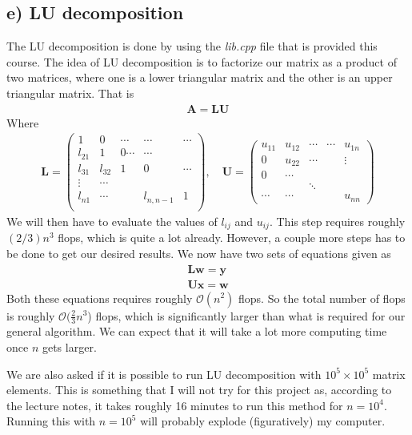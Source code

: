 \documentclass[12pt]{article}
\begin{document}
\subsection*{e) LU decomposition}
The LU decomposition is done by using the \textit{lib.cpp} file that is provided this course. The idea of LU decomposition is to factorize our matrix as a product of two matrices, where one is a lower triangular matrix and the other is an upper triangular matrix. That is
\begin{align}
\mathbf{A} = \mathbf{L}\mathbf{U}
\end{align}
Where
\begin{align*}
\mathbf{L} =
\begin{pmatrix}
1 & 0 & \cdots & \cdots & \cdots \\
l_{21} & 1 & 0 \cdots & \cdots \\
l_{31} & l_{32} & 1 & 0 & \cdots \\
\vdots & \cdots & & & \\
l_{n1} & \cdots & & l_{n,n-1} & 1 \\
\end{pmatrix}, \quad
\mathbf{U} =
\begin{pmatrix}
u_{11} & u_{12} & \cdots & \cdots & u_{1n} \\
0 & u_{22} &\cdots & & \vdots \\
0 & \cdots & & & \\
& & \ddots & & \\
\cdots& \cdots & & & u_{nn}
\end{pmatrix}
\end{align*}
We will then have to evaluate the values of $l_{ij}$ and $u_{ij}$. This step requires roughly $(2/3)n^3$ flops, which is quite a lot already. However, a couple more steps has to be done to get our desired results. We now have two sets of equations given as
\begin{align}
\mathbf{L}\mathbf{w} = \mathbf{y} \\
\mathbf{U}\mathbf{x} = \mathbf{w}
\end{align}
Both these equations requires roughly $\mathcal{O}(n^2)$ flops. So the total number of flops is roughly $\mathcal{O}(\frac{2}{3} n^3$) flops, which is significantly larger than what is required for our general algorithm. We can expect that it will take a lot more computing time once $n$ gets larger.

We are also asked if it is possible to run LU decomposition with $10^5 \times 10^5$ matrix elements. This is something that I will not try for this project as, according to the lecture notes, it takes roughly 16 minutes to run this method for $n=10^4$. Running this with $n=10^5$ will probably explode (figuratively) my computer.
\end{document}
